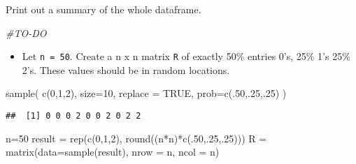 \documentclass[
]{article}
\newenvironment{Shaded}{\begin{snugshade}}{\end{snugshade}}
\newcommand{\AttributeTok}[1]{\textcolor[rgb]{0.77,0.63,0.00}{#1}}
\newcommand{\CommentTok}[1]{\textcolor[rgb]{0.56,0.35,0.01}{\textit{#1}}}
\newcommand{\ConstantTok}[1]{\textcolor[rgb]{0.00,0.00,0.00}{#1}}
\newcommand{\DecValTok}[1]{\textcolor[rgb]{0.00,0.00,0.81}{#1}}
\newcommand{\FunctionTok}[1]{\textcolor[rgb]{0.00,0.00,0.00}{#1}}
\newcommand{\NormalTok}[1]{#1}
\newcommand{\OtherTok}[1]{\textcolor[rgb]{0.56,0.35,0.01}{#1}}
\newcommand{\SpecialCharTok}[1]{\textcolor[rgb]{0.00,0.00,0.00}{#1}}
\providecommand{\tightlist}{%
  \setlength{\itemsep}{0pt}\setlength{\parskip}{0pt}}
\begin{document}
\begin{Shaded}
\end{Shaded}

Print out a summary of the whole dataframe.

\begin{Shaded}
\begin{Highlighting}[]
\CommentTok{\#TO{-}DO}
\end{Highlighting}
\end{Shaded}

\begin{itemize}
\tightlist
\item
  Let \texttt{n\ =\ 50}. Create a n x n matrix \texttt{R} of exactly
  50\% entries 0's, 25\% 1's 25\% 2's. These values should be in random
  locations.
\end{itemize}

\begin{Shaded}
\begin{Highlighting}[]
 \FunctionTok{sample}\NormalTok{(}
   \FunctionTok{c}\NormalTok{(}\DecValTok{0}\NormalTok{,}\DecValTok{1}\NormalTok{,}\DecValTok{2}\NormalTok{),}
   \AttributeTok{size=}\DecValTok{10}\NormalTok{,}
   \AttributeTok{replace =} \ConstantTok{TRUE}\NormalTok{,}
   \AttributeTok{prob=}\FunctionTok{c}\NormalTok{(.}\DecValTok{50}\NormalTok{,.}\DecValTok{25}\NormalTok{,.}\DecValTok{25}\NormalTok{)}
\NormalTok{ )}
\end{Highlighting}
\end{Shaded}

\begin{verbatim}
##  [1] 0 0 0 2 0 0 2 0 2 2
\end{verbatim}

\begin{Shaded}
\begin{Highlighting}[]
\NormalTok{n}\OtherTok{=}\DecValTok{50}
\NormalTok{result }\OtherTok{=} \FunctionTok{rep}\NormalTok{(}\FunctionTok{c}\NormalTok{(}\DecValTok{0}\NormalTok{,}\DecValTok{1}\NormalTok{,}\DecValTok{2}\NormalTok{), }\FunctionTok{round}\NormalTok{((n}\SpecialCharTok{*}\NormalTok{n)}\SpecialCharTok{*}\FunctionTok{c}\NormalTok{(.}\DecValTok{50}\NormalTok{,.}\DecValTok{25}\NormalTok{,.}\DecValTok{25}\NormalTok{)))}
\NormalTok{R }\OtherTok{=} \FunctionTok{matrix}\NormalTok{(}\AttributeTok{data=}\FunctionTok{sample}\NormalTok{(result), }\AttributeTok{nrow =}\NormalTok{ n, }\AttributeTok{ncol =}\NormalTok{ n)}
\end{Highlighting}
\end{Shaded}
\end{document}
